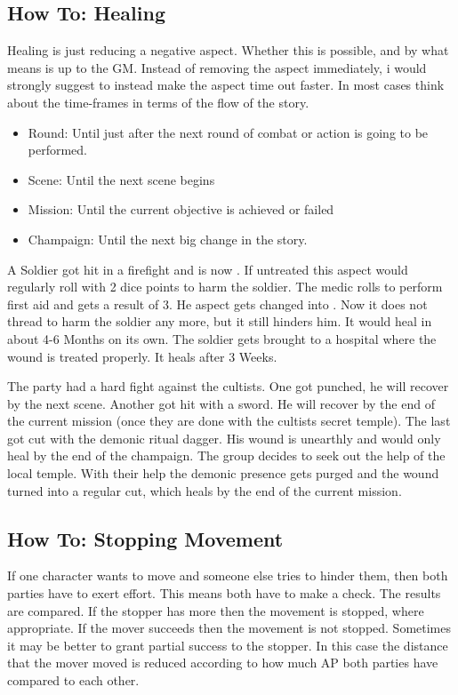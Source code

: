 \documentclass[11pt]{article}
\begin{document}
{\subsection{How To: Healing}
\label{sec:org89727b1}
Healing is just reducing a negative aspect. Whether this is possible, and by what means is up to the GM. Instead of removing the aspect immediately, i would strongly suggest to instead make the aspect time out faster. In most cases think about the time-frames in terms of the flow of the story.
\begin{itemize}
\item Round: Until just after the next round of combat or action is going to be performed.
\item Scene: Until the next scene begins
\item Mission: Until the current objective is achieved or failed
\item Champaign: Until the next big change in the story.
\end{itemize}

\begin{pwexample}
A Soldier got hit in a firefight and is now . If untreated this aspect would regularly roll with 2 dice points to harm the soldier. The medic rolls to perform first aid and gets a result of 3. He aspect gets changed into . Now it does not thread to harm the soldier any more, but it still hinders him. It would heal in about 4-6 Months on its own. The soldier gets brought to a hospital where the wound is treated properly. It heals after 3 Weeks. 
\end{pwexample}

\begin{pwexample}
The party had a hard fight against the cultists. One got punched, he will recover by the next scene. Another got hit with a sword. He will recover by the end of the current mission (once they are done with the cultists secret temple). The last got cut with the demonic ritual dagger. His wound is unearthly and would only heal by the end of the champaign. The group decides to seek out the help of the local temple. With their help the demonic presence gets purged and the wound turned into a regular cut, which heals by the end of the current mission.
\end{pwexample}
\subsection{How To: Stopping Movement}
\label{sec:org260862d}
If one character wants to move and someone else tries to hinder them, then both parties have to exert effort. This means both have to make a check. The results are compared. If the stopper has more then the movement is stopped, where appropriate. If the mover succeeds then the movement is not stopped. Sometimes it may be better to grant partial success to the stopper. In this case the distance that the mover moved is reduced according to how much AP both parties have compared to each other.
}
\end{document}
